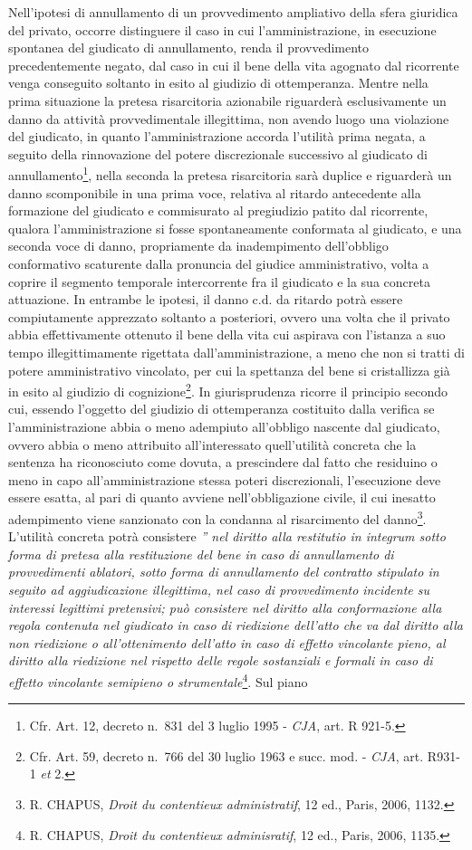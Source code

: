 \documentclass[12pt,it,a4paper,]{report}
\begin{document}
Nell'ipotesi di annullamento di un provvedimento ampliativo della sfera
giuridica del privato, occorre distinguere il caso in cui
l'amministrazione, in esecuzione spontanea del giudicato di
annullamento, renda il provvedimento precedentemente negato, dal caso in
cui il bene della vita agognato dal ricorrente venga conseguito soltanto
in esito al giudizio di ottemperanza. Mentre nella prima situazione la
pretesa risarcitoria azionabile riguarderà esclusivamente un danno da
attività provvedimentale illegittima, non avendo luogo una violazione
del giudicato, in quanto l'amministrazione accorda l'utilità prima
negata, a seguito della rinnovazione del potere discrezionale successivo
al giudicato di annullamento\footnote{Cfr. Art. 12, decreto n.~831 del 3
  luglio 1995 - \emph{CJA}, art. R 921-5.}, nella seconda la pretesa
risarcitoria sarà duplice e riguarderà un danno scomponibile in una
prima voce, relativa al ritardo antecedente alla formazione del
giudicato e commisurato al pregiudizio patito dal ricorrente, qualora
l'amministrazione si fosse spontaneamente conformata al giudicato, e una
seconda voce di danno, propriamente da inadempimento dell'obbligo
conformativo scaturente dalla pronuncia del giudice amministrativo,
volta a coprire il segmento temporale intercorrente fra il giudicato e
la sua concreta attuazione. In entrambe le ipotesi, il danno c.d. da
ritardo potrà essere compiutamente apprezzato soltanto a posteriori,
ovvero una volta che il privato abbia effettivamente ottenuto il bene
della vita cui aspirava con l'istanza a suo tempo illegittimamente
rigettata dall'amministrazione, a meno che non si tratti di potere
amministrativo vincolato, per cui la spettanza del bene si cristallizza
già in esito al giudizio di cognizione\footnote{Cfr. Art. 59, decreto
  n.~766 del 30 luglio 1963 e succ. mod. - \emph{CJA}, art. R931-1
  \emph{et} 2.}. In giurisprudenza ricorre il principio secondo cui,
essendo l'oggetto del giudizio di ottemperanza costituito dalla verifica
se l'amministrazione abbia o meno adempiuto all'obbligo nascente dal
giudicato, ovvero abbia o meno attribuito all'interessato quell'utilità
concreta che la sentenza ha riconosciuto come dovuta, a prescindere dal
fatto che residuino o meno in capo all'amministrazione stessa poteri
discrezionali, l'esecuzione deve essere esatta, al pari di quanto
avviene nell'obbligazione civile, il cui inesatto adempimento viene
sanzionato con la condanna al risarcimento del danno\footnote{R. CHAPUS,
  \emph{Droit du contentieux administratif}, 12 ed., Paris, 2006, 1132.}.
L'utilità concreta potrà consistere \emph{'' nel diritto alla restitutio
in integrum sotto forma di pretesa alla restituzione del bene in caso di
annullamento di provvedimenti ablatori, sotto forma di annullamento del
contratto stipulato in seguito ad aggiudicazione illegittima, nel caso
di provvedimento incidente su interessi legittimi pretensivi; può
consistere nel diritto alla conformazione alla regola contenuta nel
giudicato in caso di riedizione dell'atto che va dal diritto alla non
riedizione o all'ottenimento dell'atto in caso di effetto vincolante
pieno, al diritto alla riedizione nel rispetto delle regole sostanziali
e formali in caso di effetto vincolante semipieno o
strumentale}\footnote{R. CHAPUS, \emph{Droit du contentieux
  adminisratif}, 12 ed., Paris, 2006, 1135.}. Sul piano
\end{document}
